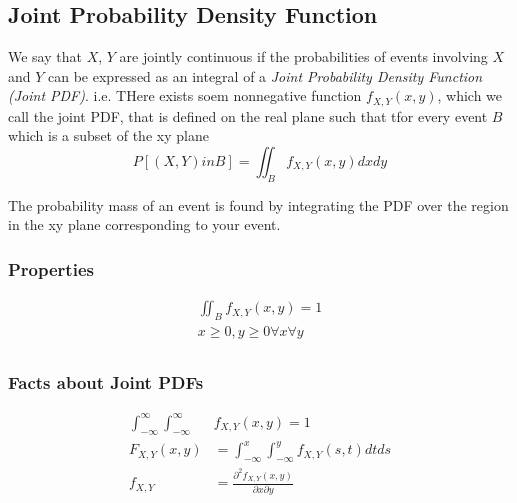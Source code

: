 	\subsection[Joint PDF]{Joint Probability Density Function} \label{subsec:Joint PDF}
		\begin{definition} \label{def:Joint PDF}
			We say that $X$, $Y$ are jointly continuous if the probabilities of events involving $X$ and $Y$ can be expressed as an integral of a \emph{Joint Probability Density Function (Joint PDF)}. \newline
			i.e. THere exists soem nonnegative function $f_{X,Y} \left( x,y \right)$, which we call the joint PDF, that is defined on the real plane such that tfor every event $B$ which is a subset of the xy plane
			\begin{equation}\label{eq:Joint PDF}
				P \left[ \left( X,Y \right) in B \right] = \iint_{B} f_{X,Y} \left( x,y \right) dx dy
			\end{equation}
			\begin{remark}
				The probability mass of an event is found by integrating the PDF over the region in the xy plane corresponding to your event.
			\end{remark}
		\end{definition}
	
		\subsubsection{Properties} \label{subsubsec:Joint PDF Properties}
			\begin{gather}
				\iint_{B} f_{X,Y} \left( x,y \right) = 1 \\
				x \geq 0, y \geq 0 \forall x \forall y \\
			\end{gather}
			
		\subsubsection{Facts about Joint PDFs} \label{subsubsec:Joint PDF Facts}
			\begin{align}
				\int_{-\infty}^{\infty} \int_{-\infty}^{\infty} &f_{X,Y} \left( x,y \right) = 1 \\
				F_{X,Y} \left( x,y \right) &= \int_{-\infty}^{x} \int_{-\infty}^{y} f_{X,Y} \left( s,t \right) dt ds \\
				f_{X,Y} &= \frac{\partial^{2} f_{X,Y} \left( x,y \right)}{\partial x \partial y} \\
			\end{align}
			
